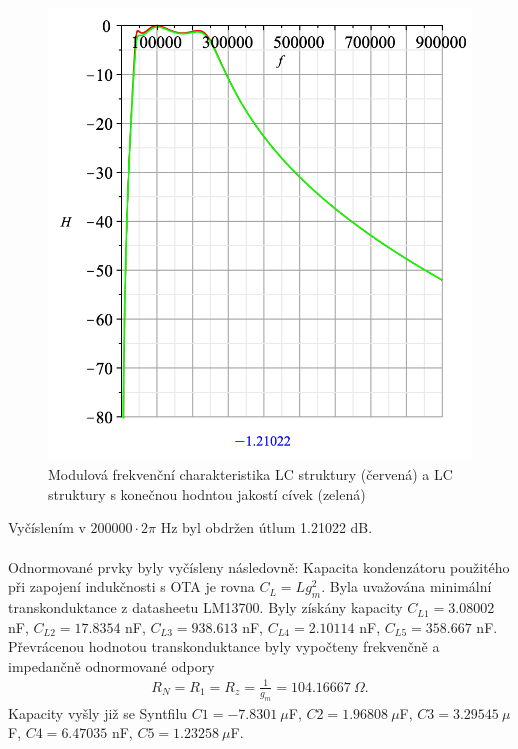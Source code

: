 \documentclass[twoside]{article}
\begin{document}
\endgroup
\begin{figure}[H]
\centering
\includegraphics[scale=0.6]{modul12.png}
\caption{Modulová frekvenční charakteristika LC struktury (červená) a LC struktury s konečnou hodntou jakostí cívek (zelená)}
\end{figure}
\noindent Vyčíslením v $200000 \cdot 2 \pi$ Hz byl obdržen útlum 1.21022 dB.\\
\\
Odnormované prvky byly vyčísleny následovně:
\noindent Kapacita kondenzátoru použitého při zapojení indukčnosti s OTA je rovna $C_L = L g_m ^2$. Byla uvažována minimální transkonduktance z datasheetu LM13700. Byly získány kapacity $C_{L1} = 3.08002 $ nF, $C_{L2} = 17.8354$ nF, $C_{L3} = 938.613 $ nF, $C_{L4} = 2.10114$ nF, $C_{L5} = 358.667$ nF.
\noindent Převrácenou hodnotou transkonduktance byly vypočteny frekvenčně a impedančně odnormované odpory
\begin{align}
R_N = R_1 = R_z = \frac{1}{g_m} = 104.16667 \ \Omega.
\end{align}
\noindent Kapacity vyšly již se Syntfilu $C1 = -7.8301 \  \mu$F, $C2 = 1.96808 \  \mu$F, $C3 = 3.29545 \  \mu$F, $C4 = 6.47035$ nF, $C5 = 1.23258 \  \mu$F.
\end{document}
